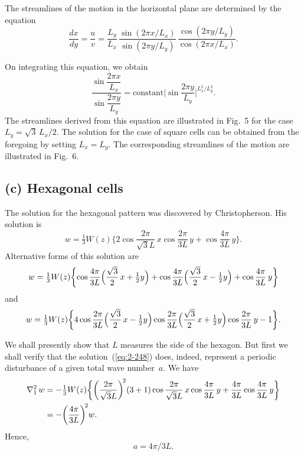 The streamlines of the motion in the horizontal plane are determined
by the equation
\begin{equation}
\label{eq:2-246}
\frac{dx}{dy} = \frac{u}{v} = \frac{L_y}{L_x}\,\frac{\sin(2\pi x/L_x)}{\sin(2\pi y/L_y)}\,\frac{\cos(2\pi y/L_y)}{\cos(2\pi x/L_x)}.
\end{equation}



On integrating this equation, we obtain
\begin{equation}
\label{eq:2-247}
\frac{\sin\dfrac{2\pi x}{L_x}}{\sin\dfrac{2\pi y}{L_y}} = \text{constant}\biggl|\sin\frac{2\pi y}{L_y}\biggr|^{L_x^2/L_y^2}.
\end{equation}
The streamlines derived from this equation are illustrated in Fig.~5 for
the case $L_y = \sqrt{3}\,L_x/2$.
The solution for the case of square cells can be obtained from the
foregoing by setting $L_x = L_y$. The corresponding streamlines of the
motion are illustrated in Fig.~6.

\subsection*{(c) Hexagonal cells}

The solution for the hexagonal pattern was discovered by Christopherson. His solution is
\begin{equation}
\label{eq:2-248}
w = \tfrac{1}{3}W(z)\biggl\{2\cos\frac{2\pi}{\sqrt{3}L}\,x\cos\frac{2\pi}{3L}\,y + \cos\frac{4\pi}{3L}\,y\biggr\}.
\end{equation}
Alternative forms of this solution are
\begin{equation}
\label{eq:2-249}
w = \tfrac{1}{3}W(z)\biggl\{\cos\frac{4\pi}{3L}\Bigl(\frac{\sqrt{3}}{2}\,x + \tfrac{1}{2}y\Bigr) + \cos\frac{4\pi}{3L}\Bigl(\frac{\sqrt{3}}{2}\,x - \tfrac{1}{2}y\Bigr) + \cos\frac{4\pi}{3L}\,y\biggr\}
\end{equation}
and
\begin{equation}
\label{eq:2-250}
w = \tfrac{1}{3}W(z)\biggl\{4\cos\frac{2\pi}{3L}\Bigl(\frac{\sqrt{3}}{2}\,x - \tfrac{1}{2}y\Bigr)\cos\frac{2\pi}{3L}\Bigl(\frac{\sqrt{3}}{2}\,x + \tfrac{1}{2}y\Bigr)\cos\frac{2\pi}{3L}\,y - 1\biggr\}.
\end{equation}

We shall presently show that $L$ measures the side of the hexagon. But
first we shall verify that the solution~(\ref{eq:2-248}) does, indeed, represent a
periodic disturbance of a given total wave number~$a$. We have
\begin{align}
\label{eq:2-251}
\nabla_1^2\,w &= -\tfrac{1}{3}W(z)\biggl\{\biggl(\frac{2\pi}{\sqrt{3}L}\biggr)^{\!2}(3+1)\cos\frac{2\pi}{\sqrt{3}L}\,x\cos\frac{4\pi}{3L}\,y + \frac{4\pi}{3L}\cos\frac{4\pi}{3L}\,y\biggr\} \notag\\
&= -\biggl(\frac{4\pi}{3L}\biggr)^{\!2}w.
\end{align}
Hence,
\begin{equation}
\label{eq:2-252}
a = 4\pi/3L.
\end{equation}

